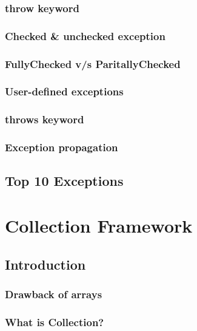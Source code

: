 \documentclass[14pt,fleqn]{extbook} %
\begin{document}
\subsection{throw keyword}

\subsection{Checked \& unchecked exception}

\subsection{FullyChecked v/s ParitallyChecked}

\subsection{User-defined exceptions}

\subsection{throws keyword}

\subsection{Exception propagation}

\section{Top 10 Exceptions}


\chapter{Collection Framework}
\section{Introduction}

\subsection{Drawback of arrays}

\subsection{What is Collection?}

\end{document}

